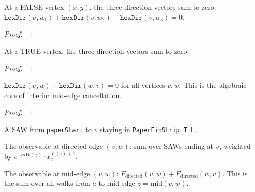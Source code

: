 \begin{lemma}\label{lem:hex_dir_false_sum}
\leanok
{}
  At a FALSE vertex $(x,y)$, the three direction vectors sum to zero:
  $\texttt{hexDir}(v, w_1) + \texttt{hexDir}(v, w_2) + \texttt{hexDir}(v, w_3) = 0$.
\end{lemma}
\begin{proof}
\leanok
\end{proof}

\begin{lemma}\label{lem:hex_dir_true_sum}
\leanok
{}
  At a TRUE vertex, the three direction vectors sum to zero.
\end{lemma}
\begin{proof}
\leanok
\end{proof}

\begin{theorem}\label{thm:interior_cancel_dir}
\leanok
{}
  $\texttt{hexDir}(v, w) + \texttt{hexDir}(w, v) = 0$ for all vertices $v, w$.
  This is the algebraic core of interior mid-edge cancellation.
\end{theorem}
\begin{proof}
\leanok
\end{proof}

\begin{definition}\label{def:strip_saw}
\leanok
{}
  A SAW from \texttt{paperStart} to $v$ staying in \texttt{PaperFinStrip T L}.
\end{definition}

\begin{definition}\label{def:F_directed}
\leanok
{}
  The observable at directed edge $(v, w)$: sum over SAWs ending at $v$,
  weighted by $e^{-i\sigma W(\gamma)} \cdot x_c^{\ell(\gamma)+1}$.
\end{definition}

\begin{definition}\label{def:F_midedge}
\leanok
{}
  The observable at mid-edge $(v,w)$: $F_{\text{directed}}(v,w) + F_{\text{directed}}(w,v)$.
  This is the sum over all walks from $a$ to mid-edge $z = \text{mid}(v,w)$.
\end{definition}

